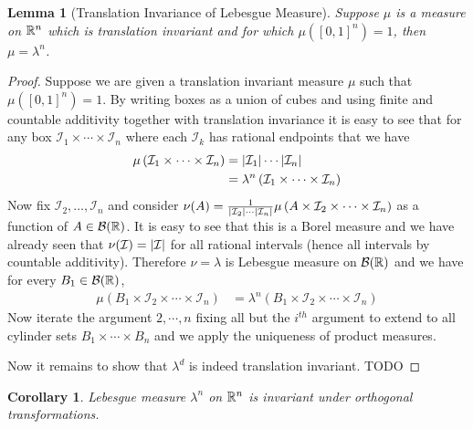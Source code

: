 \documentclass{amsart}
\newtheorem{cor}[thm]{Corollary}
\newtheorem{lem}[thm]{Lemma}
\theoremstyle{remark}
\theoremstyle{definition}
\begin{document}
\begin{lem}[Translation Invariance of Lebesgue Measure]\label{LesbegueTranslationInvariance} Suppose $\mu$ is a measure on $\mathbb{R}^n$ which is
  translation invariant and for which $\mu([0,1]^n) = 1$, then $\mu =
  \lambda^n$.
\end{lem}
\begin{proof}Suppose we are given a translation invariant measure
  $\mu$ such that $\mu([0,1]^n) = 1$.  By writing boxes as a
  union of cubes and using finite
  and countable additivity together with translation invariance it is
  easy to see that
  for any box $\mathcal{I}_1 \times \cdots \times \mathcal{I}_n$ where
  each $\mathcal{I}_k$ has rational endpoints that we have 
\begin{align*}
\mu\left (\mathcal{I}_1 \times \cdots \times
    \mathcal{I}_n \right ) &= \left \vert \mathcal{I}_1 \right \vert \cdots
  \left \vert \mathcal{I}_n \right \vert \\
 &= \lambda^n \left (\mathcal{I}_1 \times \cdots \times
    \mathcal{I}_n \right )
\end{align*}
Now fix $\mathcal{I}_2, \dots ,\mathcal{I}_n$ and consider $\nu(A) = \frac{1}{ \left \vert \mathcal{I}_2 \right \vert \cdots  \left \vert \mathcal{I}_n \right \vert}\mu \left
  (A \times \mathcal{I}_2 \times \cdots \times
    \mathcal{I}_n \right ) $ as a function of $A \in
  \mathcal{B}(\mathbb{R})$.  It is easy to see that this is a Borel
  measure and we have already seen that $\nu(\mathcal{I}) =
  \left \vert \mathcal{I} \right \vert$ for all rational intervals (hence all intervals
    by countable additivity).  Therefore $\nu = \lambda$ is Lebesgue
    measure on $\mathcal{B}(\mathbb{R})$ and we have for every $B_1 \in
    \mathcal{B}(\mathbb{R})$,
\begin{align*}
\mu\left (B_1 \times \mathcal{I}_2 \times\cdots \times
    \mathcal{I}_n \right ) 
 &= \lambda^n \left (B_1 \times \mathcal{I}_2 \times \cdots \times
    \mathcal{I}_n \right )
\end{align*}
Now iterate the argument $2, \cdots, n$ fixing all but the $i^{th}$
argument to extend to all cylinder sets $B_1 \times \cdots \times B_n$
and we apply the uniqueness of product measures.

Now it remains to show that $\lambda^d$ is indeed translation
invariant.
TODO
\end{proof}
\begin{cor}\label{LesbegueRotationInvariance} Lebesgue measure $\lambda^n$ on $\mathbb{R}^n$ is invariant
  under orthogonal transformations.
\end{cor}
\end{document}

